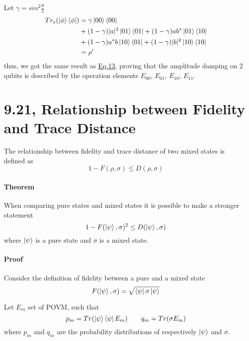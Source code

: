 \documentclass{masterthesis}
\begin{document}
Let $\gamma=sin^2\frac{\theta}{2}$
\begin{align}
    Tr_e(\ket{\phi}\bra{\phi}) &= \gamma\ket{00}\bra{00} \\ 
    & + (1-\gamma) |a|^2 \ket{01}\bra{01} + (1-\gamma) a b^{*} \ket{01}\bra{10} \\
    & + (1-\gamma) a^{*} b \ket{10}\bra{01} + (1-\gamma) |b|^2 \ket{10}\bra{10} \\
    &= \rho'
\end{align}
thus, we got the same result as \hyperref[eq:ad-dual-rail]{Eq.13}, proving that the amplitude damping on 2 qubits is described by the operation elements \hyperref[eq:op-el-1]{$E_{00}$}, \hyperref[eq:op-el-2]{$E_{01}$}, \hyperref[eq:op-el-3]{$E_{10}$}, \hyperref[eq:op-el-4]{$E_{11}$}.

\newpage
\section*{9.21, Relationship between Fidelity and Trace Distance}

The relationship between fidelity and trace distance of two mixed states is defined as
\begin{equation}
    1 - F(\rho, \sigma) \leq D(\rho, \sigma)
\end{equation}

\paragraph*{Theorem}
When comparing pure states and mixed states it is possible to make a stronger statement
\begin{equation}
    1 - F(\ket{\psi}, \sigma)^2 \leq D(\ket{\psi}, \sigma)
\end{equation}
where $\ket{\psi}$ is a pure state and $\sigma$ is a mixed state.

\paragraph*{Proof}
Consider the definition of fidelity between a pure and a mixed state
\begin{equation}
    F(\ket{\psi}, \sigma) = \sqrt{\bra{\psi}\sigma\ket{\psi}}
\end{equation}

Let $E_m$ set of POVM, such that
\begin{equation}
    p_m = Tr(\ket{\psi}\bra{\psi} E_m) \quad \quad q_m = Tr(\sigma E_m)
\end{equation}
where $p_m$ and $q_m$ are the probability distributions of respectively $\ket{\psi}$ and $\sigma$.
\end{document}
